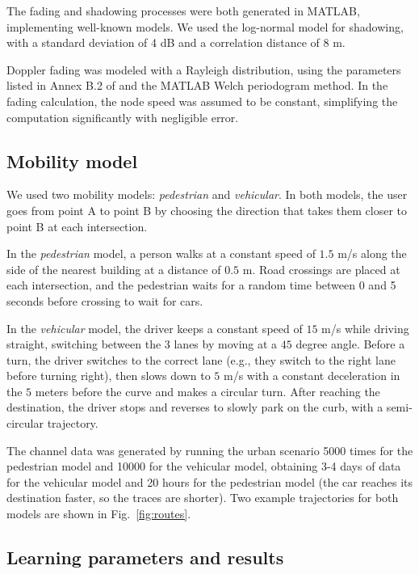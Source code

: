 \documentclass[conference, a4paper]{IEEEtran}
\begin{document}
The fading and shadowing processes were both generated in MATLAB, implementing well-known models. We used the log-normal model for shadowing, with a standard deviation of 4 dB and a correlation distance of 8 m.

Doppler fading was modeled with a Rayleigh distribution, using the parameters listed in Annex B.2 of \cite{lte136evolved} and the MATLAB Welch periodogram method. In the fading calculation, the node speed was assumed to be constant, simplifying the computation significantly with negligible error.

\subsection{Mobility model}
\label{sec:mobility}

We used two mobility models: \emph{pedestrian} and \emph{vehicular}. In both models, the user goes from point A to point B by choosing the direction that takes them closer to point B at each intersection.

In the \emph{pedestrian} model, a person walks at a constant speed of $1.5$ m/s along the side of the nearest building at a distance of $0.5$ m. Road crossings are placed at each intersection, and the pedestrian waits for a random time between 0 and 5 seconds before crossing to wait for cars.

In the \emph{vehicular} model, the driver keeps a constant speed of $15$ m/s while driving straight, switching between the 3 lanes by moving at a $45$ degree angle. Before a turn, the driver switches to the correct lane (e.g., they switch to the right lane before turning right), then slows down to $5$ m/s with a constant deceleration in the $5$ meters before the curve and makes a circular turn. After reaching the destination, the driver stops and reverses to slowly park on the curb, with a semi-circular trajectory.

The channel data was generated by running the urban scenario 5000 times for the pedestrian model and 10000 for the vehicular model, obtaining 3-4 days of data for the vehicular model and 20 hours for the pedestrian model (the car reaches its destination faster, so the traces are shorter). Two example trajectories for both models are shown in Fig.~\ref{fig:routes}.

\subsection{Learning parameters and results}
\end{document}
